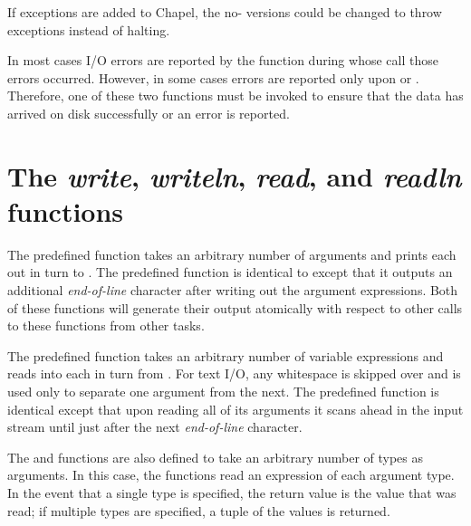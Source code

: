 \begin{future}
If exceptions are added to Chapel, the no- versions
could be changed to throw exceptions instead of halting.
\end{future}

In most cases I/O errors are reported by the function during whose
call those errors occurred. However, in some cases errors are
reported only upon  
or  .
Therefore, one of these two functions must be invoked to ensure
that the data has arrived on disk successfully or an error is reported.



\section{The {\em write}, {\em writeln}, {\em read}, and {\em readln} 
functions}

The predefined function  takes an arbitrary number of
arguments and prints each out in turn to .  The predefined
function  is identical to  except that it
outputs an additional {\em end-of-line} character after writing out
the argument expressions.  Both of these functions will generate their
output atomically with respect to other calls to these functions from
other tasks.

The predefined function  takes an arbitrary number of
variable expressions and reads into each in turn from .
For text I/O, any whitespace is skipped over and is used only to separate one
argument from the next.  The predefined function  is
identical except that upon reading all of its arguments it scans ahead
in the input stream until just after the next {\em end-of-line}
character.

The  and  functions are also defined to take
an arbitrary number of types as arguments.  In this case, the
functions read an expression of each argument type.  In the event that
a single type is specified, the return value is the value that was
read; if multiple types are specified, a tuple of the values is
returned.

